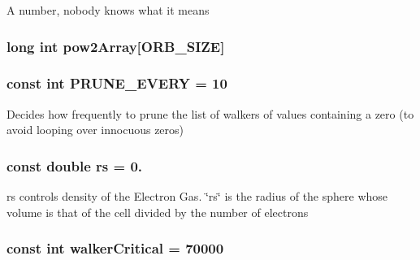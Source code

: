 A number, nobody knows what it means \hypertarget{UEG__MAIN__binarytest_8C_a5a4a522e121fab9651a940cabf5ac77d}{
\subsubsection[{pow2\-Array}]{\setlength{\rightskip}{0pt plus 5cm}long int pow2\-Array\mbox{[}O\-R\-B\-\_\-\-S\-I\-Z\-E\mbox{]}}}\label{UEG__MAIN__binarytest_8C_a5a4a522e121fab9651a940cabf5ac77d}
\hypertarget{UEG__MAIN__binarytest_8C_aecb8ec6a7a5a3e737bef25336ec80927}{
\subsubsection[{P\-R\-U\-N\-E\-\_\-\-E\-V\-E\-R\-Y}]{\setlength{\rightskip}{0pt plus 5cm}const int P\-R\-U\-N\-E\-\_\-\-E\-V\-E\-R\-Y = 10}}\label{UEG__MAIN__binarytest_8C_aecb8ec6a7a5a3e737bef25336ec80927}
Decides how frequently to prune the list of walkers of values containing a zero (to avoid looping over innocuous zeros) \hypertarget{UEG__MAIN__binarytest_8C_a363ad74e3d4570cd6bfaa4622e0af0bd}{
\subsubsection[{rs}]{\setlength{\rightskip}{0pt plus 5cm}const double rs = 0.}}\label{UEG__MAIN__binarytest_8C_a363ad74e3d4570cd6bfaa4622e0af0bd}
rs controls density of the Electron Gas. \char`\"{}rs\char`\"{} is the radius of the sphere whose volume is that of the cell divided by the number of electrons \hypertarget{UEG__MAIN__binarytest_8C_a6c7e0fd46bc659f43a5e2fe841b0aeeb}{
\subsubsection[{walker\-Critical}]{\setlength{\rightskip}{0pt plus 5cm}const int walker\-Critical = 70000}}\label{UEG__MAIN__binarytest_8C_a6c7e0fd46bc659f43a5e2fe841b0aeeb}
